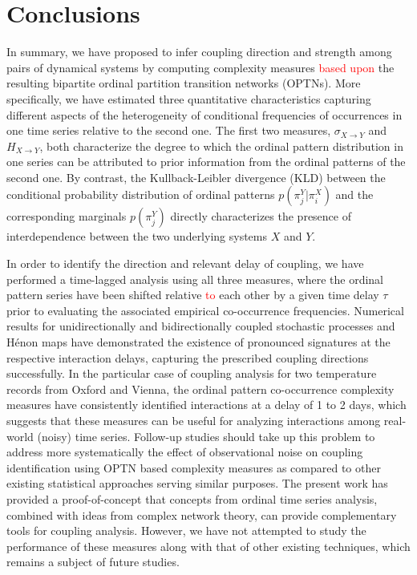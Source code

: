 \documentclass[12pt,aip,cha,reprint,nofootinbib]{revtex4-1}
\begin{document}
\section{Conclusions} \label{sec:con}

In summary, we have proposed to infer coupling direction and strength among pairs of dynamical systems by computing complexity measures \textcolor{red}{based upon} the resulting bipartite ordinal {\color{red}partition} transition networks (OPTNs). More specifically, we have estimated three quantitative characteristics capturing different aspects of the heterogeneity of conditional frequencies of occurrences in one time series relative to the second one. The first two measures, $\sigma_{X\to Y}$ and $H_{X\to Y}$, both characterize the degree to which the ordinal pattern distribution in one series can be attributed to prior information from the ordinal patterns of the second one. By contrast, the Kullback-Leibler divergence (KLD) between the conditional probability distribution of ordinal patterns $p(\pi_{j}^{Y} | \pi_i^{X})$ and the corresponding marginals $p(\pi_j^{Y})$ directly characterizes the presence of interdependence between the two underlying systems $X$ and $Y$. 

In order to identify the direction and relevant delay of coupling, we have performed a time-lagged analysis using all three measures, where the ordinal pattern series have been shifted relative \textcolor{red}{to} each other by a given time delay $\tau$ prior to evaluating the associated empirical co-occurrence frequencies. Numerical results for unidirectionally and bidirectionally coupled stochastic processes and H\'enon maps have demonstrated the existence of pronounced signatures at the respective interaction delays, capturing the prescribed coupling directions successfully. In the particular case of coupling analysis for two temperature records from Oxford and Vienna, the ordinal pattern co-occurrence complexity measures have consistently identified interactions at a delay of 1 to 2 days, which suggests that these measures can be useful for analyzing interactions among real-world (noisy) time series. Follow-up studies should take up this problem to address more systematically the effect of observational noise on coupling identification using OPTN based complexity measures as compared to other existing statistical approaches serving similar purposes. The present work has provided a proof-of-concept that concepts from ordinal time series analysis, combined with ideas from complex network theory, can provide complementary tools for coupling analysis. However, we have not attempted to study the performance of these measures along with that of other existing techniques, which remains a subject of future studies.
\end{document}
